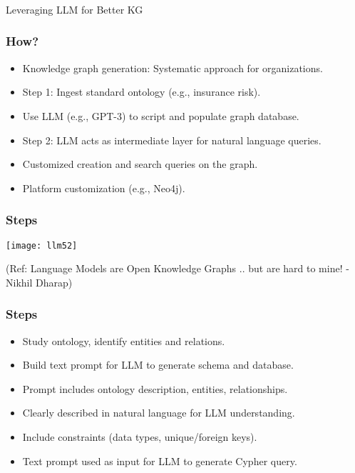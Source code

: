 \begin{frame}[fragile]\frametitle{}
\begin{center}
{\Large Leveraging LLM for Better KG}

\end{center}
\end{frame}

\begin{frame}[fragile]\frametitle{How?}

\begin{itemize}
\item Knowledge graph generation: Systematic approach for organizations.
\item Step 1: Ingest standard ontology (e.g., insurance risk).
\item Use LLM (e.g., GPT-3) to script and populate graph database.
\item Step 2: LLM acts as intermediate layer for natural language queries.
\item Customized creation and search queries on the graph.
\item Platform customization (e.g., Neo4j).
\end{itemize}
\end{frame}

\begin{frame}[fragile]\frametitle{Steps}

\begin{center}
\texttt{[image: llm52]}
\end{center}	

{\tiny (Ref: Language Models are Open Knowledge Graphs .. but are hard to mine! - Nikhil Dharap)}
\end{frame}



\begin{frame}[fragile]\frametitle{Steps}

\begin{itemize}
\item Study ontology, identify entities and relations.
\item Build text prompt for LLM to generate schema and database.
\item Prompt includes ontology description, entities, relationships.
\item Clearly described in natural language for LLM understanding.
\item Include constraints (data types, unique/foreign keys).
\item Text prompt used as input for LLM to generate Cypher query.\end{itemize}
\end{frame}



